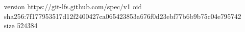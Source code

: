version https://git-lfs.github.com/spec/v1
oid sha256:7f177953517d12f2400427ca065423853a676f0d23ebf77b6b9b75c04e795742
size 524384
